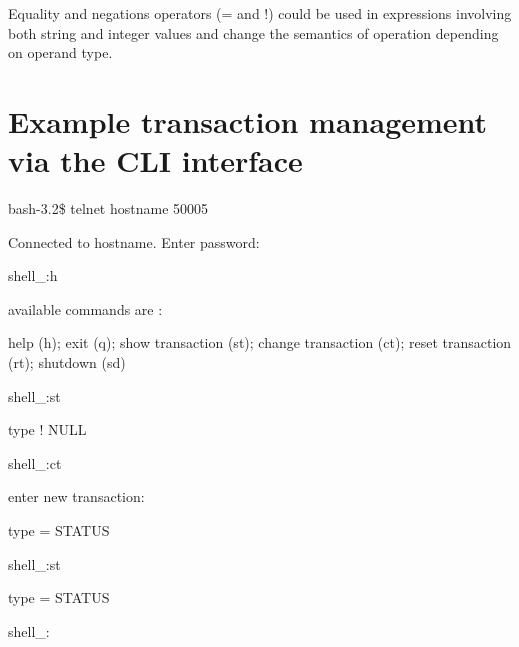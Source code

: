 \documentclass[11pt]{article} %
\begin{document}

Equality and negations  operators (= and !) could be used in expressions involving both string and integer values and change the semantics of operation depending on operand type.

\section{Example transaction management via the CLI interface}

bash-3.2\$ telnet hostname 50005

Connected to hostname.
Enter password:

shell\_:h

available commands are :

help (h); exit (q); show transaction (st); change transaction (ct); reset transaction (rt); shutdown (sd)

shell\_:st

type ! NULL

shell\_:ct

enter new transaction:

type = STATUS

shell\_:st

type = STATUS

shell\_:
\end{document}
